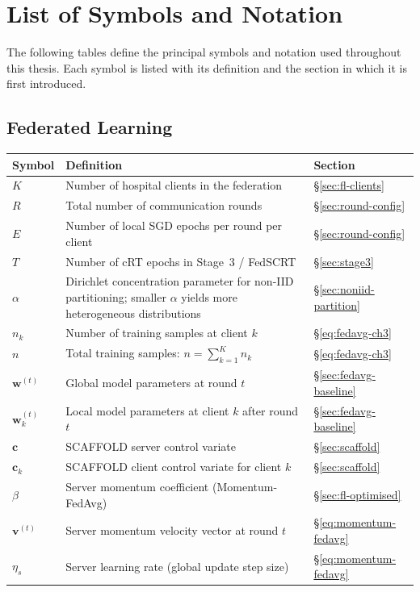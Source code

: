 \chapter*{List of Symbols and Notation}
\label{chap:nomenclature}

The following tables define the principal symbols and
notation used throughout this thesis.
Each symbol is listed with its definition and the section
in which it is first introduced.

\section*{Federated Learning}
\begin{center}
\renewcommand{\arraystretch}{1.4}
\begin{tabular}{p{2.8cm} p{9.5cm} p{1.6cm}}
  \hline
  \textbf{Symbol} & \textbf{Definition} & \textbf{Section} \\
  \hline
  $K$
    & Number of hospital clients in the federation
    & §\ref{sec:fl-clients} \\
  $R$
    & Total number of communication rounds
    & §\ref{sec:round-config} \\
  $E$
    & Number of local SGD epochs per round per client
    & §\ref{sec:round-config} \\
  $T$
    & Number of cRT epochs in Stage~3 / FedSCRT
    & §\ref{sec:stage3} \\
  $\alpha$
    & Dirichlet concentration parameter for non-IID
      partitioning; smaller $\alpha$ yields more
      heterogeneous distributions
    & §\ref{sec:noniid-partition} \\
  $n_k$
    & Number of training samples at client $k$
    & §\ref{eq:fedavg-ch3} \\
  $n$
    & Total training samples: $n = \sum_{k=1}^K n_k$
    & §\ref{eq:fedavg-ch3} \\
  $\mathbf{w}^{(t)}$
    & Global model parameters at round $t$
    & §\ref{sec:fedavg-baseline} \\
  $\mathbf{w}_k^{(t)}$
    & Local model parameters at client $k$ after round $t$
    & §\ref{sec:fedavg-baseline} \\
  $\mathbf{c}$
    & SCAFFOLD server control variate
    & §\ref{sec:scaffold} \\
  $\mathbf{c}_k$
    & SCAFFOLD client control variate for client $k$
    & §\ref{sec:scaffold} \\
  $\beta$
    & Server momentum coefficient (Momentum-FedAvg)
    & §\ref{sec:fl-optimised} \\
  $\mathbf{v}^{(t)}$
    & Server momentum velocity vector at round $t$
    & §\ref{eq:momentum-fedavg} \\
  $\eta_s$
    & Server learning rate (global update step size)
    & §\ref{eq:momentum-fedavg} \\
  \hline
\end{tabular}
\end{center}

